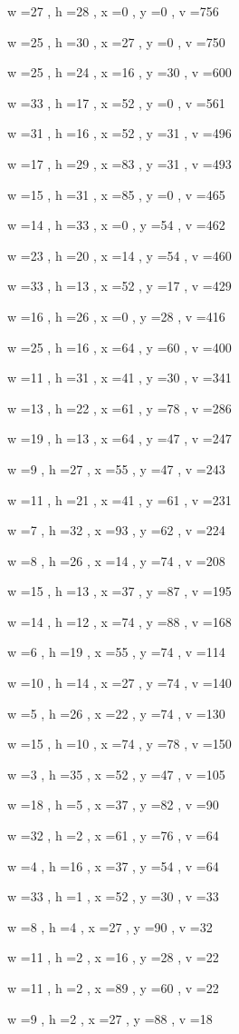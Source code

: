 \documentclass[11pt]{article}
\begin{document}
w =27 , h =28 , x =0 , y =0 , v =756
\par
w =25 , h =30 , x =27 , y =0 , v =750
\par
w =25 , h =24 , x =16 , y =30 , v =600
\par
w =33 , h =17 , x =52 , y =0 , v =561
\par
w =31 , h =16 , x =52 , y =31 , v =496
\par
w =17 , h =29 , x =83 , y =31 , v =493
\par
w =15 , h =31 , x =85 , y =0 , v =465
\par
w =14 , h =33 , x =0 , y =54 , v =462
\par
w =23 , h =20 , x =14 , y =54 , v =460
\par
w =33 , h =13 , x =52 , y =17 , v =429
\par
w =16 , h =26 , x =0 , y =28 , v =416
\par
w =25 , h =16 , x =64 , y =60 , v =400
\par
w =11 , h =31 , x =41 , y =30 , v =341
\par
w =13 , h =22 , x =61 , y =78 , v =286
\par
w =19 , h =13 , x =64 , y =47 , v =247
\par
w =9 , h =27 , x =55 , y =47 , v =243
\par
w =11 , h =21 , x =41 , y =61 , v =231
\par
w =7 , h =32 , x =93 , y =62 , v =224
\par
w =8 , h =26 , x =14 , y =74 , v =208
\par
w =15 , h =13 , x =37 , y =87 , v =195
\par
w =14 , h =12 , x =74 , y =88 , v =168
\par
w =6 , h =19 , x =55 , y =74 , v =114
\par
w =10 , h =14 , x =27 , y =74 , v =140
\par
w =5 , h =26 , x =22 , y =74 , v =130
\par
w =15 , h =10 , x =74 , y =78 , v =150
\par
w =3 , h =35 , x =52 , y =47 , v =105
\par
w =18 , h =5 , x =37 , y =82 , v =90
\par
w =32 , h =2 , x =61 , y =76 , v =64
\par
w =4 , h =16 , x =37 , y =54 , v =64
\par
w =33 , h =1 , x =52 , y =30 , v =33
\par
w =8 , h =4 , x =27 , y =90 , v =32
\par
w =11 , h =2 , x =16 , y =28 , v =22
\par
w =11 , h =2 , x =89 , y =60 , v =22
\par
w =9 , h =2 , x =27 , y =88 , v =18
\par
\newpage
\end{document}
